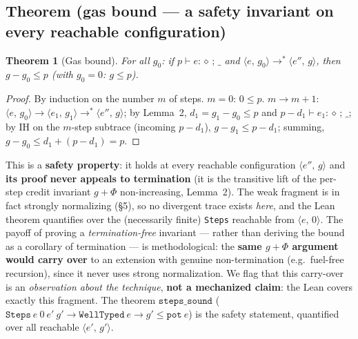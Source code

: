 \documentclass[11pt]{article}
\theoremstyle{plain}
\newtheorem*{theoremU}{Theorem}
\newcommand{\J}[3]{#1 \vdash #2 : \diamond\,;\,#3}    %
\newcommand{\cfg}[2]{\langle #1,\, #2\rangle}          %
\begin{document}
\subsection{Theorem (gas bound --- a safety invariant on every reachable configuration)}

\begin{theoremU}[Gas bound]
For all $g_0$: if $\J{p}{e}{\_}$ and $\cfg{e}{g_0} \to^{*} \cfg{e''}{g}$, then $g - g_0 \le p$
(with $g_0 = 0$: $g \le p$).
\end{theoremU}

\begin{proof}
By induction on the number $m$ of steps. $m = 0$: $0 \le p$. $m \to m+1$:
$\cfg{e}{g_0} \to \cfg{e_1}{g_1} \to^{*} \cfg{e''}{g}$; by Lemma~2, $d_1 = g_1 - g_0 \le p$ and
$\J{p - d_1}{e_1}{\_}$; by IH on the $m$-step subtrace (incoming $p - d_1$),
$g - g_1 \le p - d_1$; summing, $g - g_0 \le d_1 + (p - d_1) = p$.
\end{proof}

This is a \textbf{safety property}: it holds at every reachable configuration $\cfg{e''}{g}$ and
\textbf{its proof never appeals to termination} (it is the transitive lift of the per-step credit
invariant $g + \Phi$ non-increasing, Lemma~2). The weak fragment is in fact strongly normalizing
(\S5), so no divergent trace exists \emph{here}, and the Lean theorem quantifies over the
(necessarily finite) \texttt{Steps} reachable from $\cfg{e}{0}$. The payoff of proving a
\emph{termination-free} invariant --- rather than deriving the bound as a corollary of termination
--- is methodological: the \textbf{same $g + \Phi$ argument would carry over} to an extension with
genuine non-termination (e.g.\ fuel-free recursion), since it never uses strong normalization. We
flag that this carry-over is an \emph{observation about the technique}, \textbf{not a mechanized
claim}: the Lean covers exactly this fragment. The theorem
$\texttt{steps\_sound}$
($\texttt{Steps}\ e\ 0\ e'\ g' \to \texttt{WellTyped}\ e \to g' \le \texttt{pot}\ e$)
is the safety statement, quantified over all reachable $\cfg{e'}{g'}$.
\end{document}
